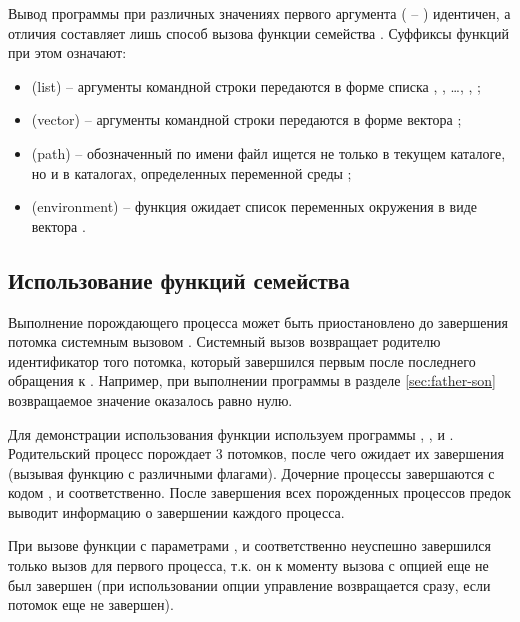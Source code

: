 Вывод программы при различных значениях первого аргумента ( -- ) идентичен, а отличия составляет лишь способ вызова функции семейства . Суффиксы функций при этом означают:
\begin{itemize}
	\item {} (list) -- аргументы командной строки передаются в форме списка , , \dots, , ;
	\item {} (vector) -- аргументы командной строки передаются в форме вектора ;
	\item {} (path) -- обозначенный по имени файл ищется не только в текущем каталоге, но и в каталогах, определенных переменной среды ;
	\item {} (environment) -- функция ожидает список переменных окружения в виде вектора .
\end{itemize}

\subsection{Использование функций семейства }

Выполнение порождающего процесса может быть приостановлено до завершения потомка системным вызовом . Системный вызов  возвращает родителю идентификатор того потомка, который завершился первым после последнего обращения к . Например, при выполнении программы в разделе \ref{sec:father-son} возвращаемое значение оказалось равно нулю. 

Для демонстрации использования функции  используем программы , ,  и . Родительский процесс порождает 3 потомков, после чего ожидает их завершения (вызывая функцию  с различными флагами). Дочерние процессы завершаются с кодом ,  и  соответственно. После завершения всех порожденных процессов предок выводит информацию о завершении каждого процесса.









При вызове функции  с параметрами ,  и  соответственно неуспешно завершился только вызов  для первого процесса, т.к. он к моменту вызова  с опцией  еще не был завершен (при использовании опции  управление возвращается сразу, если потомок еще не завершен).

